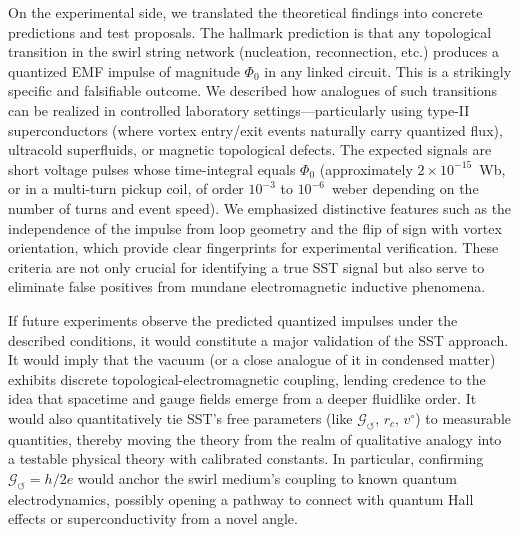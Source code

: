 \documentclass[12pt]{article}
\begin{document}
    On the experimental side, we translated the theoretical findings into concrete predictions and test proposals. The hallmark prediction is that any topological transition in the swirl string network (nucleation, reconnection, etc.) produces a quantized EMF impulse of magnitude $\Phi_{0}$ in any linked circuit. This is a strikingly specific and falsifiable outcome. We described how analogues of such transitions can be realized in controlled laboratory settings—particularly using type-II superconductors (where vortex entry/exit events naturally carry quantized flux), ultracold superfluids, or magnetic topological defects. The expected signals are short voltage pulses whose time-integral equals $\Phi_{0}$ (approximately $2\times10^{-15}$~Wb, or in a multi-turn pickup coil, of order $10^{-3}$ to $10^{-6}$~weber depending on the number of turns and event speed). We emphasized distinctive features such as the independence of the impulse from loop geometry and the flip of sign with vortex orientation, which provide clear fingerprints for experimental verification. These criteria are not only crucial for identifying a true SST signal but also serve to eliminate false positives from mundane electromagnetic inductive phenomena.

    If future experiments observe the predicted quantized impulses under the described conditions, it would constitute a major validation of the SST approach. It would imply that the vacuum (or a close analogue of it in condensed matter) exhibits discrete topological-electromagnetic coupling, lending credence to the idea that spacetime and gauge fields emerge from a deeper fluidlike order. It would also quantitatively tie SST’s free parameters (like $\mathcal{G}_{\!\boldsymbol{\circlearrowleft}}$, $r_c$, $v^{\circ}$) to measurable quantities, thereby moving the theory from the realm of qualitative analogy into a testable physical theory with calibrated constants. In particular, confirming $\mathcal{G}_{\!\boldsymbol{\circlearrowleft}} = h/2e$ would anchor the swirl medium’s coupling to known quantum electrodynamics, possibly opening a pathway to connect with quantum Hall effects or superconductivity from a novel angle.
\end{document}
